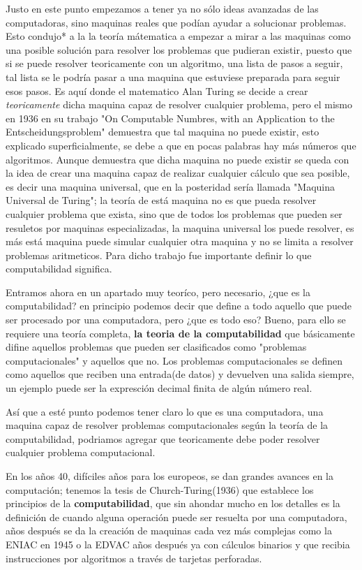 \documentclass[12pt]{article}
\begin{document}
	Justo en este punto empezamos a tener ya no sólo ideas avanzadas de las computadoras, sino maquinas reales que podían ayudar a solucionar problemas. Esto condujo*   	a la la teoría mátematica a empezar a mirar a las maquinas como una posible solución
	para resolver   los problemas que pudieran existir, puesto que si se puede resolver teoricamente con un algoritmo, una lista de pasos
	a seguir, tal lista se le podría pasar a una maquina que estuviese preparada para seguir esos pasos. Es aquí donde el matematico Alan Turing se decide a crear
	\textit{teoricamente} dicha maquina capaz de resolver cualquier problema, pero el mismo
	en 1936 en su trabajo 
	"On Computable Numbres, with an Application to the Entscheidungsproblem" demuestra que tal maquina no puede existir, esto explicado superficialmente, se debe
	a que en pocas palabras hay más números que algoritmos. Aunque demuestra que dicha maquina no puede existir se queda con la idea de crear una maquina capaz de 	    
	realizar cualquier cálculo que sea posible,
	es decir una maquina universal, que en la posteridad sería llamada "Maquina Universal de Turing"; la teoría de está maquina no es que pueda resolver cualquier
	problema que exista, sino que de todos los problemas que pueden ser resuletos por maquinas especializadas, la maquina universal los
	puede resolver, es más está maquina puede simular cualquier otra maquina y no se limita a resolver problemas aritmeticos. Para dicho trabajo fue importante 
	definir lo que computabilidad significa.
	
	Entramos ahora en un apartado muy teoríco, pero necesario, ¿que es la computabilidad? en principio podemos decir que define a todo aquello que puede ser 
	procesado por una computadora, pero ¿que es todo eso? Bueno, para ello se requiere una teoría completa, \textbf{la teoria de la computabilidad} que
	básicamente difine aquellos problemas que pueden ser clasificados como "problemas computacionales" y aquellos que no. Los problemas computacionales se
	definen como aquellos que reciben una entrada(de datos) y devuelven una salida siempre, un ejemplo puede ser la expresción decimal finita de algún número real.
	
	Así que a esté punto podemos tener claro lo que es una computadora, una maquina capaz de resolver problemas computacionales según la teoría de la computabilidad,
	podriamos agregar que teoricamente debe poder resolver cualquier problema computacional.
	
	
	En los años 40, difíciles años para los
	europeos, se dan grandes avances en la computación; tenemos la tesis de Church-Turing(1936) que establece los principios de la \textbf{computabilidad}, que
	sin ahondar mucho en los detalles es la definición de cuando alguna operación puede ser resuelta por una computadora, años después se da la creación
	de maquinas cada vez más complejas como la ENIAC en 1945 o la EDVAC años después ya con cálculos binarios y que recibia instrucciones por algoritmos
	a través de tarjetas perforadas.
	
\end{document}
